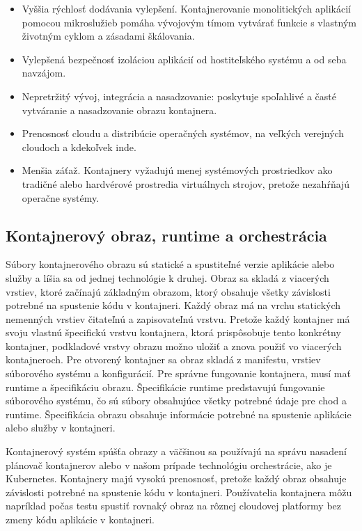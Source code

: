 \begin{itemize}
    \item Vyššia rýchlosť dodávania vylepšení. Kontajnerovanie monolitických aplikácií pomocou mikroslužieb pomáha vývojovým tímom vytvárať funkcie s vlastným životným cyklom a zásadami škálovania.
	\item Vylepšená bezpečnosť izoláciou aplikácií od hostiteľského systému a od seba navzájom.
	\item Nepretržitý vývoj, integrácia a nasadzovanie: poskytuje spoľahlivé a časté vytváranie a nasadzovanie obrazu kontajnera.
	\item Prenosnosť cloudu a distribúcie operačných systémov, na veľkých verejných cloudoch a kdekoľvek inde.
	\item Menšia záťaž. Kontajnery vyžadujú menej systémových prostriedkov ako tradičné alebo hardvérové prostredia virtuálnych strojov, pretože nezahŕňajú operačne systémy.
\end{itemize}

\subsection{Kontajnerový obraz, runtime a orchestrácia}

Súbory kontajnerového obrazu sú statické a spustiteľné verzie aplikácie alebo služby a líšia sa od jednej technológie k druhej. Obraz sa skladá z viacerých vrstiev, ktoré začínajú základným obrazom, ktorý obsahuje všetky závislosti potrebné na spustenie kódu v kontajneri. Každý obraz má na vrchu statických nemenných vrstiev čitateľnú a zapisovateľnú vrstvu. Pretože každý kontajner má svoju vlastnú špecifickú vrstvu kontajnera, ktorá prispôsobuje tento konkrétny kontajner, podkladové vrstvy obrazu možno uložiť a znova použiť vo viacerých kontajneroch. Pre otvorený kontajner sa obraz skladá z manifestu, vrstiev súborového systému a konfigurácií. Pre správne fungovanie kontajnera, musí mať runtime a špecifikáciu obrazu. Špecifikácie runtime predstavujú fungovanie súborového systému, čo sú súbory obsahujúce všetky potrebné údaje pre chod a runtime. Špecifikácia obrazu obsahuje informácie potrebné na spustenie aplikácie alebo služby v kontajneri.\cite{orchestrate}

Kontajnerový systém spúšťa obrazy a väčšinou sa používajú na správu nasadení plánovač kontajnerov alebo v našom prípade technológiu orchestrácie, ako je Kubernetes. Kontajnery majú vysokú prenosnosť, pretože každý obraz obsahuje závislosti potrebné na spustenie kódu v kontajneri. Používatelia kontajnera môžu napríklad počas testu spustiť rovnaký obraz na rôznej cloudovej platformy bez zmeny kódu aplikácie v kontajneri.

